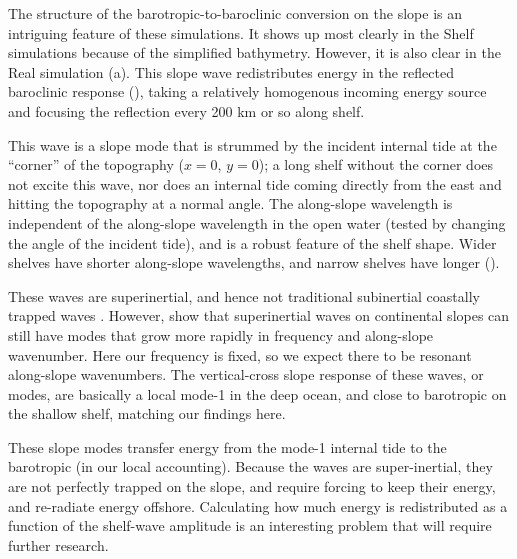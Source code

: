 \documentclass[10pt]{article}
\newcommand{\tempS}[1]{}
\newcommand{\mn}[1]{{\sc #1}}
\begin{document}

The structure of the barotropic-to-baroclinic conversion on the slope is an intriguing feature of these simulations.  It shows up most clearly in the \mn{Shelf} simulations because of the simplified bathymetry.  However, it is also clear in the \mn{Real} simulation (a).  This slope wave redistributes energy in the reflected baroclinic response (), taking a relatively homogenous incoming energy source and focusing the reflection every 200 km or so along shelf.

This wave is a slope mode that is strummed by the incident internal tide at the ``corner'' of the topography ($x=0$, $y=0$);  a long shelf without the corner does not excite this wave, nor does an internal tide coming directly from the east and hitting the topography at a normal angle.  The along-slope wavelength is independent of the along-slope wavelength in the open water (tested by changing the angle of the incident tide), and is a robust feature of the shelf shape.  Wider shelves have shorter along-slope wavelengths, and narrow shelves have longer ().  

These waves are superinertial, and hence not traditional subinertial coastally trapped waves \citep[i.e.][]{brink91}.  However, \citet{dalesherwin96} show that superinertial waves on continental slopes can still have modes that grow more rapidly in frequency and along-slope wavenumber.  Here our frequency is fixed, so we expect there to be resonant along-slope wavenumbers.  The vertical-cross slope response of these waves, or modes, are basically a local mode-1 in the deep ocean, and close to barotropic on the shallow shelf, matching our findings here.  

These slope modes transfer energy from the mode-1 internal tide to the barotropic (in our local accounting).  Because the waves are super-inertial, they are not perfectly trapped on the slope, and require forcing to keep their energy, and re-radiate energy offshore.  Calculating how much energy is redistributed as a function of the shelf-wave amplitude is an interesting problem that will require further research.
\end{document}
